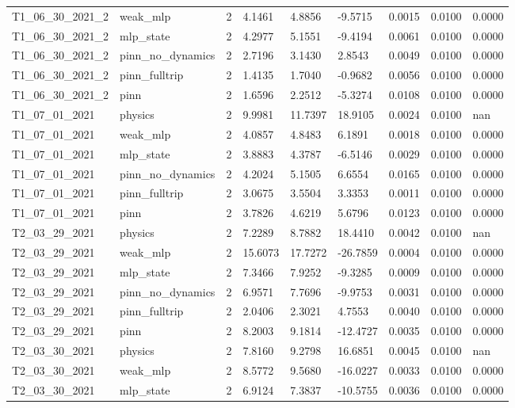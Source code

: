 \begin{table}[t]
\begin{tabular}{lllllllll}
T1\_06\_30\_2021\_2 & weak\_mlp & 2 & 4.1461 & 4.8856 & -9.5715 & 0.0015 & 0.0100 & 0.0000 \\
T1\_06\_30\_2021\_2 & mlp\_state & 2 & 4.2977 & 5.1551 & -9.4194 & 0.0061 & 0.0100 & 0.0000 \\
T1\_06\_30\_2021\_2 & pinn\_no\_dynamics & 2 & 2.7196 & 3.1430 & 2.8543 & 0.0049 & 0.0100 & 0.0000 \\
T1\_06\_30\_2021\_2 & pinn\_fulltrip & 2 & 1.4135 & 1.7040 & -0.9682 & 0.0056 & 0.0100 & 0.0000 \\
T1\_06\_30\_2021\_2 & pinn & 2 & 1.6596 & 2.2512 & -5.3274 & 0.0108 & 0.0100 & 0.0000 \\
T1\_07\_01\_2021 & physics & 2 & 9.9981 & 11.7397 & 18.9105 & 0.0024 & 0.0100 & nan \\
T1\_07\_01\_2021 & weak\_mlp & 2 & 4.0857 & 4.8483 & 6.1891 & 0.0018 & 0.0100 & 0.0000 \\
T1\_07\_01\_2021 & mlp\_state & 2 & 3.8883 & 4.3787 & -6.5146 & 0.0029 & 0.0100 & 0.0000 \\
T1\_07\_01\_2021 & pinn\_no\_dynamics & 2 & 4.2024 & 5.1505 & 6.6554 & 0.0165 & 0.0100 & 0.0000 \\
T1\_07\_01\_2021 & pinn\_fulltrip & 2 & 3.0675 & 3.5504 & 3.3353 & 0.0011 & 0.0100 & 0.0000 \\
T1\_07\_01\_2021 & pinn & 2 & 3.7826 & 4.6219 & 5.6796 & 0.0123 & 0.0100 & 0.0000 \\
T2\_03\_29\_2021 & physics & 2 & 7.2289 & 8.7882 & 18.4410 & 0.0042 & 0.0100 & nan \\
T2\_03\_29\_2021 & weak\_mlp & 2 & 15.6073 & 17.7272 & -26.7859 & 0.0004 & 0.0100 & 0.0000 \\
T2\_03\_29\_2021 & mlp\_state & 2 & 7.3466 & 7.9252 & -9.3285 & 0.0009 & 0.0100 & 0.0000 \\
T2\_03\_29\_2021 & pinn\_no\_dynamics & 2 & 6.9571 & 7.7696 & -9.9753 & 0.0031 & 0.0100 & 0.0000 \\
T2\_03\_29\_2021 & pinn\_fulltrip & 2 & 2.0406 & 2.3021 & 4.7553 & 0.0040 & 0.0100 & 0.0000 \\
T2\_03\_29\_2021 & pinn & 2 & 8.2003 & 9.1814 & -12.4727 & 0.0035 & 0.0100 & 0.0000 \\
T2\_03\_30\_2021 & physics & 2 & 7.8160 & 9.2798 & 16.6851 & 0.0045 & 0.0100 & nan \\
T2\_03\_30\_2021 & weak\_mlp & 2 & 8.5772 & 9.5680 & -16.0227 & 0.0033 & 0.0100 & 0.0000 \\
T2\_03\_30\_2021 & mlp\_state & 2 & 6.9124 & 7.3837 & -10.5755 & 0.0036 & 0.0100 & 0.0000 \\

\end{tabular}
\end{table}
